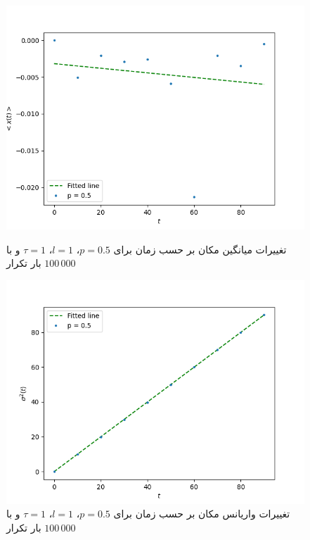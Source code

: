 \documentclass[11pt, a4paper]{article}
\begin{document}
\begin{figure}[h!]
  \centering
  \begin{minipage}[b]{0.48\textwidth}
    \includegraphics[width=\textwidth]{q2_x_0.5_100_10_100000.png}
    \caption{تغییرات میانگین مکان بر حسب زمان برای $p = 0.5$، $l = 1$، $\tau = 1$ و با $100\,000$ بار تکرار}
    \label{fig:q2_0.5_x}
  \end{minipage}
  \hfill
  \begin{minipage}[b]{0.48\textwidth}
    \includegraphics[width=\textwidth]{q2_var_0.5_100_10_100000.png}
    \caption{تغییرات واریانس مکان بر حسب زمان برای $p = 0.5$، $l = 1$، $\tau = 1$ و با $100\,000$ بار تکرار}
    \label{fig:q2_0.5_var}
  \end{minipage}
  \centering
  \begin{minipage}[b]{0.48\textwidth}

\end{minipage}
\end{figure}
\end{document}
